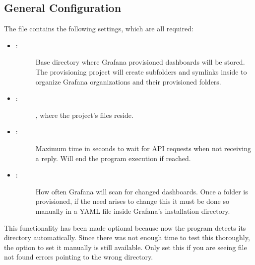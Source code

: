 \documentclass[letterpaper,10pt,english]{sphinxmanual}
\begin{document}
\subsection{General Configuration}
\label{\detokenize{readme:general-configuration}}
The  file contains the following settings, which are all required:
\begin{itemize}
\item {} \begin{description}
\item[{:}] \leavevmode
Base directory where Grafana provisioned dashboards will be
stored. The provisioning project will create subfolders and symlinks inside
to organize Grafana organizations and their provisioned folders.

\end{description}

\item {} \begin{description}
\item[{:}] \leavevmode
\sphinxtitleref{*} , where the project’s files reside.

\end{description}

\item {} \begin{description}
\item[{:}] \leavevmode
Maximum time in seconds to wait for API requests when not receiving
a reply. Will end the program execution if reached.

\end{description}

\item {} \begin{description}
\item[{:}] \leavevmode
How often Grafana will scan for changed dashboards.
Once a folder is provisioned, if the need arises to change this it must be
done so manually in a YAML file inside Grafana’s installation directory.

\end{description}

\end{itemize}

\sphinxtitleref{*} This functionality has been made optional because now the program detects
its directory automatically. Since there was not enough time to test this
thoroughly, the option to set it manually is still available. Only set this if
you are seeing file not found errors pointing to the wrong directory.
\end{document}

